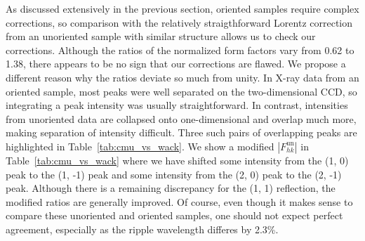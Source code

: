 As discussed extensively in the previous section, oriented samples require 
complex corrections, so 
comparison with the relatively straigthforward Lorentz correction from an 
unoriented sample with similar structure allows us to check our corrections.  
Although the ratios of the normalized form factors vary from 0.62 to 1.38, 
there appears to be no sign that our corrections are flawed.  We propose a 
different reason why the ratios deviate so much from unity. In X-ray data from 
an oriented sample, most peaks were
well separated on the two-dimensional CCD, so integrating a peak intensity was 
usually straightforward.
In contrast, intensities from unoriented data are collapsed onto 
one-dimensional and overlap much more, making separation of intensity 
difficult.  Three such pairs of overlapping peaks are highlighted in 
Table~\ref{tab:cmu_vs_wack}.  
We show a modified $\left|F_{hk}^\text{un}\right|$ in 
Table~\ref{tab:cmu_vs_wack} where we have shifted some intensity from 
the (1, 0) peak to the (1, -1) peak and some intensity from the (2, 0) peak 
to the (2, -1) peak.  
Although there is a remaining discrepancy for the (1, 1) reflection, 
the modified ratios are generally improved. Of course, even though it makes 
sense to compare these unoriented and oriented samples, one should not expect 
perfect agreement, especially as the ripple wavelength differes by 2.3\%.  


